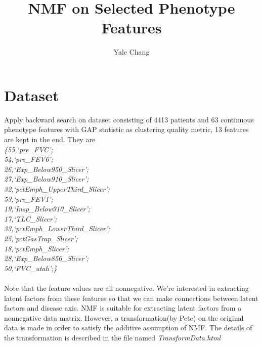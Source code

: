 \documentclass[11pt]{article}
\title{\textbf{NMF on Selected Phenotype Features}}
\author{Yale Chang}
\begin{document}
\maketitle

\section{Dataset}
Apply backward search on dataset consisting of 4413 patients and 63 continuous phenotype features with GAP statistic as clustering quality metric, 13 features are kept in the end. They are\\
\textit{\{55,`pre\_FVC';\\
54,`pre\_FEV6';\\
26,`Exp\_Below950\_Slicer';\\
27,`Exp\_Below910\_Slicer';\\
32,`pctEmph\_UpperThird\_Slicer';\\
53,`pre\_FEV1';\\
19,`Insp\_Below910\_Slicer';\\
17,`TLC\_Slicer';\\
33,`pctEmph\_LowerThird\_Slicer';\\
25,`pctGasTrap\_Slicer';\\
18,`pctEmph\_Slicer';\\
28,`Exp\_Below856\_Slicer';\\
50,`FVC\_utah';\}}\\
\\
Note that the feature values are all nonnegative. We're interested in extracting latent factors from these features so that we can make connections between latent factors and disease axis. NMF is suitable for extracting latent factors from a nonnegative data matrix. However, a transformation(by Pete) on the original data is made in order to satisfy the additive assumption of NMF. The details of the transformation is described in the file named \textit{TransformData.html}
\end{document}
